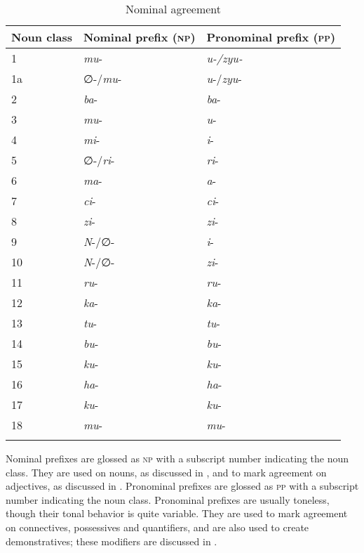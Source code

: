 \begin{table}
\label{bkm:Ref492029881}\caption{\label{tab:4:1}Nominal agreement}

\begin{tabular}{lll}
\lsptoprule
Noun class & Nominal prefix (\textsc{np}) & Pronominal prefix (\textsc{pp})\\
\midrule
1 & \textit{mu}- & \textit{u-/zyu-}\\
1a & ∅-/\textit{mu}- & \textit{u}-/\textit{zyu}-\\
2 & \textit{ba}- & \textit{ba}-\\
3 & \textit{mu}- & \textit{u}-\\
4 & \textit{mi}- & \textit{i}-\\
5 & ∅-/\textit{ri}- & \textit{ri}-\\
6 & \textit{ma}- & \textit{a}-\\
7 & \textit{ci}- & \textit{ci}-\\
8 & \textit{zi}- & \textit{zi}-\\
9 & \textit{N}-/∅- & \textit{i}-\\
10 & \textit{N}-/∅- & \textit{zi}-\\
11 & \textit{ru}- & \textit{ru}-\\
12 & \textit{ka}- & \textit{ka}-\\
13 & \textit{tu}- & \textit{tu}-\\
14 & \textit{bu}- & \textit{bu}-\\
15 & \textit{ku}- & \textit{ku}-\\
16 & \textit{ha}- & \textit{ha}-\\
17 & \textit{ku}- & \textit{ku}-\\
18 & \textit{mu}- & \textit{mu}-\\
\lspbottomrule
\end{tabular}
\end{table}

Nominal prefixes are glossed as \textsc{np} with a subscript number indicating the noun class. They are used on nouns, as discussed in , and to mark agreement on adjectives, as discussed in . Pronominal prefixes are glossed as \textsc{pp} with a subscript number indicating the noun class. Pronominal prefixes are usually toneless, though their tonal behavior is quite variable. They are used to mark agreement on connectives, possessives and quantifiers, and are also used to create demonstratives; these modifiers are discussed in .

